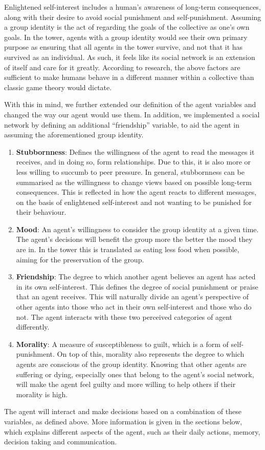 Enlightened self-interest includes a human’s awareness of long-term consequences, along with their desire to avoid social punishment and self-punishment. Assuming a group identity is the act of regarding the goals of the collective as one's own goals. In the tower, agents with a group identity would see their own primary purpose as ensuring that all agents in the tower survive, and not that it has survived as an individual. As such, it feels like its social network is an extension of itself and care for it greatly. According to research, the above factors are sufficient to make humans behave in a different manner within a collective than classic game theory would dictate.\par
With this in mind, we further extended our definition of the agent variables and changed the way our agent would use them. In addition, we implemented a social network by defining an additional “friendship” variable, to aid the agent in assuming the aforementioned group identity.\par 
\begin{enumerate}
    \item \textbf{Stubbornness}: Defines the willingness of the agent to read the messages it receives, and in doing so, form relationships. Due to this, it is also more or less willing to succumb to peer pressure. In general, stubbornness can be summarised as the willingness to change views based on possible long-term consequences. This is reflected in how the agent reacts to different messages, on the basis of enlightened self-interest and not wanting to be punished for their behaviour.
    \item \textbf{Mood}: An agent’s willingness to consider the group identity at a given time. The agent’s decisions will benefit the group more the better the mood they are in. In the tower this is translated as eating less food when possible, aiming for the preservation of the group. 
    \item \textbf{Friendship}: The degree to which another agent believes an agent has acted in its own self-interest. This defines the degree of social punishment or praise that an agent receives. This will naturally divide an agent’s perspective of other agents into those who act in their own self-interest and those who do not. The agent interacts with these two perceived categories of agent differently.
    \item \textbf{Morality}: A measure of susceptibleness to guilt, which is a form of self-punishment. On top of this, morality also represents the degree to which agents are conscious of the group identity. Knowing that other agents are suffering or dying, especially ones that belong to the agent's social network, will make the agent feel guilty and more willing to help others if their morality is high. 
\end{enumerate}
The agent will interact and make decisions based on a combination of these variables, as defined above. More information is given in the sections below, which explains different aspects of the agent, such as their daily actions, memory, decision taking and communication. 


